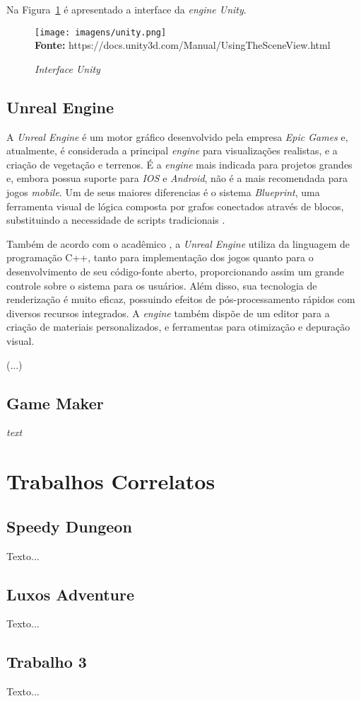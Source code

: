Na Figura~\ref{fig:unity} é apresentado a interface da \textit{engine Unity}.

\FloatBarrier 
\begin{figure}[!htbp]
	\centering
	\caption{\textit{Interface Unity}}
	\texttt{[image: imagens/unity.png]}
	\\\textbf{Fonte:} https://docs.unity3d.com/Manual/UsingTheSceneView.html 
	\label{fig:unity}
\end{figure}
\FloatBarrier



\subsection{Unreal Engine}

A \textit{Unreal Engine} é um motor gráfico desenvolvido pela empresa \textit{Epic Games} e, atualmente, é considerada a principal \textit{engine} para visualizações realistas, e a criação de vegetação e terrenos. É a \textit{engine} mais indicada para projetos grandes e, embora possua suporte para \textit{IOS} e \textit{Android}, não é a mais recomendada para jogos \textit{mobile}. Um de seus maiores diferencias é o sistema \textit{Blueprint}, uma ferramenta visual de lógica composta por grafos conectados através de blocos, substituindo a necessidade de scripts tradicionais \cite{Smid2017}.

Também de acordo com o acadêmico , a \textit{Unreal Engine} utiliza da linguagem de programação C++, tanto para implementação dos jogos quanto para o desenvolvimento de seu código-fonte aberto, proporcionando assim um grande controle sobre o sistema para os usuários. Além disso, sua tecnologia de renderização é muito eficaz, possuindo efeitos de pós-processamento rápidos com diversos recursos integrados. A \textit{engine} também dispõe de um editor para a criação de  materiais personalizados, e ferramentas para otimização e depuração visual.

(...)

\subsection{Game Maker}	

\textit{text}


\section{Trabalhos Correlatos}

\subsection{Speedy Dungeon}

Texto...

\subsection{Luxos Adventure}

Texto...

\subsection{Trabalho 3}

Texto...
